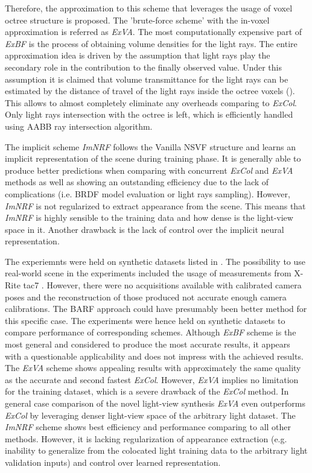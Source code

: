 Therefore, the approximation to this scheme that leverages the usage of voxel octree structure is proposed.
The 'brute-force scheme' with the in-voxel approximation is referred as \textit{ExVA}.
The most computationally expensive part of \textit{ExBF} is the process of
obtaining volume densities for the light rays.
The entire approximation idea is driven by the assumption
that light rays play the secondary role in the contribution to the finally observed value.
Under this assumption it is claimed that volume transmittance for the light rays
can be estimated by the distance of travel of the light rays inside the octree voxels ().
This allows to almost completely eliminate any overheads comparing to \textit{ExCol}.
Only light rays intersection with the octree is left,
which is efficiently handled using AABB ray intersection algorithm.

The implicit scheme \textit{ImNRF} follows the Vanilla NSVF structure
and learns an implicit representation of the scene during training phase.
It is generally able to produce better predictions
when comparing with concurrent \textit{ExCol} and \textit{ExVA} methods
as well as showing an outstanding efficiency due to the lack of complications
(i.e. BRDF model evaluation or light rays sampling).
However, \textit{ImNRF} is not regularized to extract appearance from the scene.
This means that \textit{ImNRF} is highly sensible to the training data
and how dense is the light-view space in it.
Another drawback is the lack of control over the implicit neural representation.


The experiemnts were held on synthetic datasets listed in .
The possibility to use real-world scene in the experiments included the usage of measurements from X-Rite tac7 \cite{merzbach2017highquality}.
However, there were no acquisitions available with calibrated camera poses
and the reconstruction of those produced not accurate enough camera calibrations.
The BARF approach \cite{lin2021barf} could have presumably been better method for this specific case.
The experiments were hence held on synthetic datasets to compare performance of corresponding schemes.
Although \textit{ExBF} scheme is the most general and considered to produce the most accurate results,
it appears with a questionable applicability and does not impress with the achieved results.
The \textit{ExVA} scheme shows appealing results with approximately the same quality as the accurate and second fastest \textit{ExCol}.
However, \textit{ExVA} implies no limitation for the training dataset,
which is a severe drawback of the \textit{ExCol} method.
In general case comparison of the novel light-view synthesis \textit{ExVA} 
even outperforms \textit{ExCol} by leveraging denser light-view space of the arbitrary light dataset.
The \textit{ImNRF} scheme shows best efficiency and performance
comparing to all other methods.
However, it is lacking regularization of appearance extraction
(e.g. inability to generalize from the colocated light training data to the arbitrary light validation inputs)
and control over learned representation.



